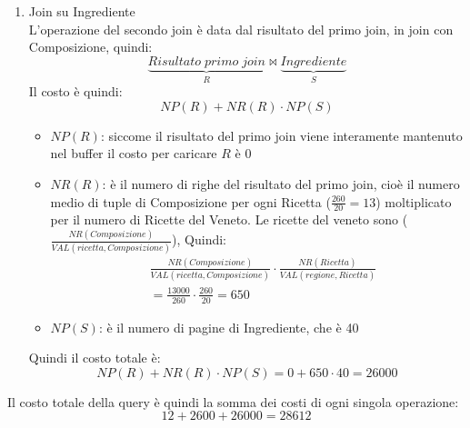\documentclass[a4paper]{article}
\begin{document}
\begin{exercise}
\begin{enumerate}
\begin{enumerate}
\begin{itemize}
            \item \( NR(R) \): è il numero di righe di Ricetta selezionate
              da Sel.Veneto che è data dalla \textbf{selettività} dell'attributo
              regione nella tabella Ricetta:
              \[
                NR(R) = \frac{NR(Ricetta)}{VAL(regione, Ricetta)} = \frac{260}{20} = 13
              \] 

            \item \( NP(S) \): è il numero di pagine di Composizione, che è 200
          \end{itemize}
          Quindi il costo totale è:
          \[
            NP(R) + NR(R) \cdot NP(S)
            =
            0 + 13 \cdot 200 = 2600
          \] 

        \item Join su Ingrediente\\
          L'operazione del secondo join è data dal risultato del primo join, 
          in join con Composizione, quindi:
          \[
            \underbrace{Risultato\;primo\;join}_R \bowtie
            \underbrace{Ingrediente}_{S}
          \] 
          Il costo è quindi:
          \[
            NP(R) + NR(R) \cdot NP(S)
          \] 
          \begin{itemize}
            \item \( NP(R) \): siccome il risultato del primo join viene
              interamente mantenuto nel buffer il costo per caricare \( R \) 
              è 0

            \item \( NR(R) \): è il numero di righe del risultato del primo
              join, cioè il numero medio di tuple di Composizione per ogni
              Ricetta (\( \frac{260}{20} = 13 \)) moltiplicato per il numero di Ricette del Veneto.
              Le ricette del veneto sono (\( \frac{NR(Composizione)}{VAL(ricetta, Composizione)} \)),
              Quindi:
              \[
                \begin{aligned}
                  &\frac{NR(Composizione)}{VAL(ricetta, Composizione)} \cdot
                  \frac{NR(Ricetta)}{VAL(regione, Ricetta)}\\
                  & = \frac{13000}{260} \cdot \frac{260}{20} = 650
                \end{aligned}
              \] 

            \item \( NP(S) \): è il numero di pagine di Ingrediente, che è 40
          \end{itemize}
          Quindi il costo totale è:
          \[
            NP(R) + NR(R) \cdot NP(S)
            =
            0 + 650 \cdot 40 = 26000
          \]
      \end{enumerate}
      Il costo totale della query è quindi la somma dei costi di ogni singola
      operazione:
      \[
        12 + 2600 + 26000 = 28612
      \] 


\end{enumerate}
\end{exercise}
\end{document}
